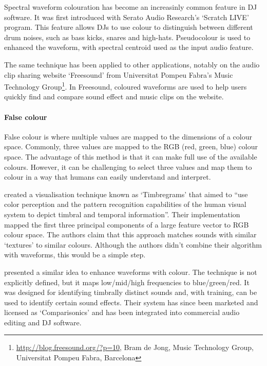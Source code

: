 Spectral waveform colouration has become an increasinly common feature in DJ software. It was first introduced with 
Serato Audio Research's `Scratch LIVE' program.
This feature allows DJs to use colour to distinguish between different drum noises, such as bass kicks, snares and
high-hats. Pseudocolour is used to enhanced the waveform, with spectral centroid used as the input audio feature.

The same technique has been applied to other applications, notably on the audio clip sharing website `Freesound' from
Universitat Pompeu Fabra's Music Technology Group\footnote{\url{http://blog.freesound.org/?p=10}, Bram de Jong, Music
  Technology Group, Universitat Pompeu Fabra, Barcelona}. In Freesound, coloured waveforms are used to help users
quickly find and compare sound effect and music clips on the website.

\paragraph{False colour}\label{sec:falsecolour}
False colour is where multiple values are mapped to the dimensions of a colour space. Commonly, three values are
mapped to the RGB (red, green, blue) colour space.  The advantage of this method is that it can make full use of the
available colours.  However, it can be challenging to select three values and map them to colour in a way that humans
can easily understand and interpret.

\citet{Tzanetakis2000} created a visualisation technique known as `Timbregrams' that aimed to ``use color perception
and the pattern recognition capabilities of the human visual system to depict timbral and temporal information''. Their
implementation mapped the first three principal components of a large feature vector to RGB colour space. The authors
claim that this approach matches sounds with similar `textures' to similar colours.
Although the authors didn't combine their algorithm with waveforms, this would be a simple step.

\citet{Rice2005} presented a similar idea to enhance waveforms with colour. The technique is not
explicitly defined, but it maps low/mid/high frequencies to blue/green/red. It was designed for identifying
timbrally distinct sounds and, with training, can be used to identify certain sound effects. Their system has since
been marketed and licensed as `Comparisonics' and has been integrated into commercial audio editing and DJ
software.

